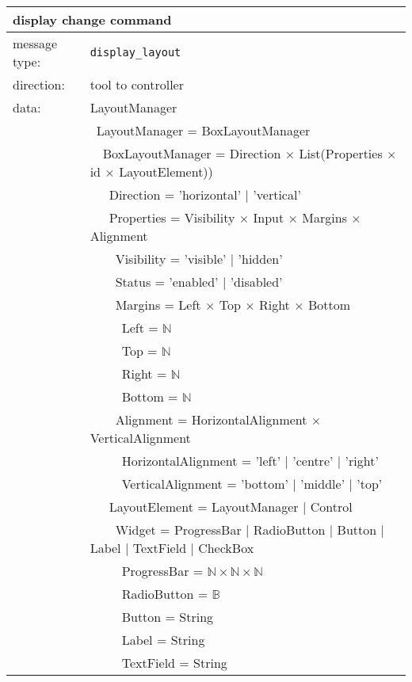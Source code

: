 \documentclass{article}
\newcommand{\msg}[1]{\texttt{#1}}
\begin{document}
   \begin{table}[H]
    \begin{center}
     \begin{tabular}{|ll|}
      \hline
       \multicolumn{2}{|l|}{\textbf{display change command}} \\
      \hline
       message type:   & \msg{display\_layout} \\
      \hline
       direction:      & tool to controller \\
       data:           & LayoutManager \\
                       & \ LayoutManager = BoxLayoutManager \\
                       & \ \ BoxLayoutManager = Direction $\times$ List(Properties $\times$ id $\times$ LayoutElement)) \\
                       & \ \ \ Direction = 'horizontal' $|$ 'vertical' \\
                       & \ \ \ Properties = Visibility $\times$ Input $\times$ Margins $\times$ Alignment \\
                       & \ \ \ \ Visibility = 'visible' $|$ 'hidden' \\
                       & \ \ \ \ Status = 'enabled' $|$ 'disabled' \\
                       & \ \ \ \ Margins = Left $\times$ Top $\times$ Right $\times$ Bottom \\
                       & \ \ \ \ \ Left   = $\mathbb{N}$ \\
                       & \ \ \ \ \ Top    = $\mathbb{N}$ \\
                       & \ \ \ \ \ Right  = $\mathbb{N}$ \\
                       & \ \ \ \ \ Bottom = $\mathbb{N}$ \\
                       & \ \ \ \ Alignment = HorizontalAlignment $\times$ VerticalAlignment \\
                       & \ \ \ \ \ HorizontalAlignment = 'left' $|$ 'centre' $|$ 'right' \\
                       & \ \ \ \ \ VerticalAlignment = 'bottom' $|$ 'middle' $|$ 'top' \\
                       & \ \ \ LayoutElement = LayoutManager $|$ Control \\
                       & \ \ \ \ Widget = ProgressBar $|$ RadioButton $|$ Button $|$ Label $|$ TextField $|$ CheckBox \\
                       & \ \ \ \ \ ProgressBar = $\mathbb{N} \times \mathbb{N} \times \mathbb{N}$ \\
                       & \ \ \ \ \ RadioButton = $\mathbb{B}$ \\
                       & \ \ \ \ \ Button      = String \\
                       & \ \ \ \ \ Label       = String \\
                       & \ \ \ \ \ TextField   = String \\
      \hline
     \end{tabular}
    \end{center}
   \end{table}
\end{document}
